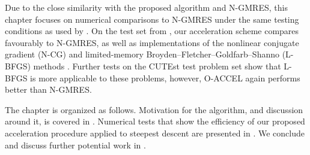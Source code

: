 \documentclass[main.tex]{subfiles}
\begin{document}
Due to the close similarity with the proposed algorithm and N-GMRES,
this chapter focuses on numerical comparisons to N-GMRES under the
same testing conditions as used by \citet{sterck2013steepest}. On the
test set from \citet{sterck2013steepest}, our acceleration scheme
compares favourably to N-GMRES, as well as implementations of the
nonlinear conjugate gradient (N-CG) and limited-memory
Broyden--Fletcher--Goldfarb--Shanno (L-BFGS) methods
\citep{nocedal2006numerical}.  Further tests on the CUTEst test
problem set \citep{gould2015cutest} show that L-BFGS is more
applicable to these problems, however, O-ACCEL again performs better
than N-GMRES.

The chapter is organized as follows. Motivation for the algorithm,
and discussion around it, is covered in .
Numerical tests that show the efficiency of our proposed acceleration
procedure applied to steepest descent are presented in
. We conclude and discuss further potential
work in .
\end{document}
